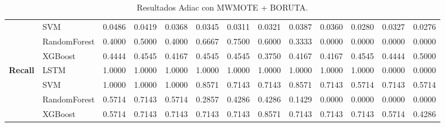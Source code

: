 \begin{table}[h]
\begin{adjustbox}{max width=15cm}
\begin{tabular}{|c|l|r|r|r|r|r|r|r|r|r|r|r|}
			& SVM &  0.0486 &  0.0419 &  0.0368 &  0.0345 &  0.0311 &  0.0321 &  0.0387 &  0.0360 &  0.0280 &  0.0327 &  0.0276 \\
			& RandomForest &  0.4000 &  0.5000 &  0.4000 &  0.6667 &  0.7500 &  0.6000 &  0.3333 &  0.0000 &  0.0000 &  0.0000 &  0.0000 \\
			& XGBoost &  0.4444 &  0.4545 &  0.4167 &  0.4545 &  0.4545 &  0.3750 &  0.4167 &  0.4167 &  0.4545 &  0.4444 &  0.5000 \\
			\hline
			\textbf{Recall} & LSTM &  1.0000 &  1.0000 &  1.0000 &  1.0000 &  1.0000 &  1.0000 &  1.0000 &  1.0000 &  1.0000 &  0.0000 &  0.0000 \\
			& SVM &  1.0000 &  1.0000 &  1.0000 &  0.8571 &  0.7143 &  0.7143 &  0.8571 &  0.7143 &  0.5714 &  0.7143 &  0.5714 \\
			& RandomForest &  0.5714 &  0.7143 &  0.5714 &  0.2857 &  0.4286 &  0.4286 &  0.1429 &  0.0000 &  0.0000 &  0.0000 &  0.0000 \\
			& XGBoost &  0.5714 &  0.7143 &  0.7143 &  0.7143 &  0.7143 &  0.8571 &  0.7143 &  0.7143 &  0.7143 &  0.5714 &  0.4286 \\
			\hline
		\end{tabular}
	\end{adjustbox}
	\caption{Resultados Adiac con MWMOTE + BORUTA.}
	\label{tab:Adiac_MWMOTE_BORUTA}
\end{table}
\newpage
